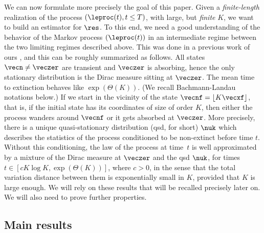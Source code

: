 We can now formulate more precisely the goal of this paper.
Given a \emph{finite-length} realization of the process $(\leproc(t), t\leq T)$, with large, but \emph{finite} $K$, we want to build an
estimator for $\res$.
To this end, we need a good understanding of the behavior of the Markov process $(\leproc(t))$ in an intermediate regime between the
two limiting regimes described above. This was done in a previous work of ours \cite{ccm2}, and this can be roughly summarized as follows.
All states $\vecn\neq \veczer$ are transient and $\veczer$ is absorbing, hence the only stationary distribution is the Dirac measure sitting at
$\veczer$. The mean time to extinction behaves like $\exp(\Theta(K))$. (We recall Bachmann-Landau notations below.)
If we start in the vicinity of the state $\vecnf = \lfloor K\vecxf\rfloor$, that is, if the initial state has its coordinates of size of order $K$,
then either the process wanders around $\vecnf$ or it gets absorbed at $\veczer$.
More precisely, there is a unique quasi-stationary distribution (qsd, for short) $\nuk$ which describes the statistics of the process conditioned
to be non-extinct before time $t$. Without this conditioning, the law of the process at time~$t$ is well approximated by a mixture of the
Dirac measure at $\veczer$ and the qsd $\nuk$, for times $t\in\left[c K\log K, \exp(\Theta(K))\right]$, where $c>0$, in the sense that the total variation
distance between them is exponentially small in $K$, provided that $K$ is large enough.
We will rely on these results that will be recalled precisely later on. We will also need to prove further properties.

\subsection{Main results}\label{subsec:main-results}


